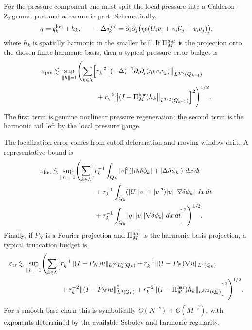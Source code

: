 \documentclass[11pt]{article}
\numberwithin{equation}{section}
\newcommand{\eps}{\varepsilon}
\newcommand{\dd}{\,d}
\begin{document}
For the pressure component one must split the local pressure into a Calderon--Zygmund part and a harmonic part.  Schematically,
\[
    q=q_k^{\rm loc}+h_k,
    \qquad
    -\Delta q_k^{\rm loc}
    =
    \partial_i\partial_j
    \bigl(\eta_k(U_iv_j+v_iU_j+v_iv_j)\bigr),
\]
where $h_k$ is spatially harmonic in the smaller ball.  If $\Pi_M^{\rm har}$ is the projection onto the chosen finite harmonic basis, then a typical pressure error budget is
\begin{equation}\label{eq:pressure-error-budget}
\begin{aligned}
    \eps_{\rm prs}
    \lesssim
    \sup_{\|h\|=1}
    \Biggl(
    \sum_{k\in\Lambda}
    \Bigl[
    &r_k^{-2}
    \bigl\|
    (-\Delta)^{-1}\partial_i\partial_j(\eta_k v_iv_j)
    \bigr\|_{L^{3/2}(Q_{k+1})}\\
    &+r_k^{-2}
    \bigl\|(I-\Pi_M^{\rm har})h_k\bigr\|_{L^{3/2}(Q_{k+1})}
    \Bigr]^2
    \Biggr)^{1/2}.
\end{aligned}
\end{equation}
The first term is genuine nonlinear pressure regeneration; the second term is the harmonic tail left by the local pressure gauge.

The localization error comes from cutoff deformation and moving-window drift.  A representative bound is
\begin{equation}\label{eq:localization-error-budget}
\begin{aligned}
    \eps_{\rm loc}
    \lesssim
    \sup_{\|h\|=1}
    \Biggl(
    \sum_{k\in\Lambda}
    \Bigl[
    &r_k^{-1}\int_{Q_k}|v|^2
    (|\partial_t\delta\phi_k|+|\Delta\delta\phi_k|)\,\dd x\dd t\\
    &+r_k^{-1}\int_{Q_k}(|U||v|+|v|^2)|v|\,|\nabla\delta\phi_k|\,\dd x\dd t\\
    &+r_k^{-1}\int_{Q_k}|q|\,|v|\,|\nabla\delta\phi_k|\,\dd x\dd t
    \Bigr]^2
    \Biggr)^{1/2}.
\end{aligned}
\end{equation}
Finally, if $P_N$ is a Fourier projection and $\Pi_M^{\rm har}$ is the harmonic-basis projection, a typical truncation budget is
\begin{equation}\label{eq:truncation-error-budget}
\begin{aligned}
    \eps_{\rm tr}
    \lesssim
    \sup_{\|h\|=1}
    \Biggl(
    \sum_{k\in\Lambda}
    \Bigl[
    &r_k^{-1}\|(I-P_N)u\|_{L_t^\infty L_x^2(Q_k)}
    +r_k^{-1}\|(I-P_N)\nabla u\|_{L^2(Q_k)}\\
    &+r_k^{-2}\|(I-P_N)u\|_{L^3(Q_k)}^3
    +r_k^{-2}\|(I-\Pi_M^{\rm har})h_k\|_{L^{3/2}(Q_k)}
    \Bigr]^2
    \Biggr)^{1/2}.
\end{aligned}
\end{equation}
For a smooth base chain this is symbolically $O(N^{-s})+O(M^{-\beta})$, with exponents determined by the available Sobolev and harmonic regularity.
\end{document}
